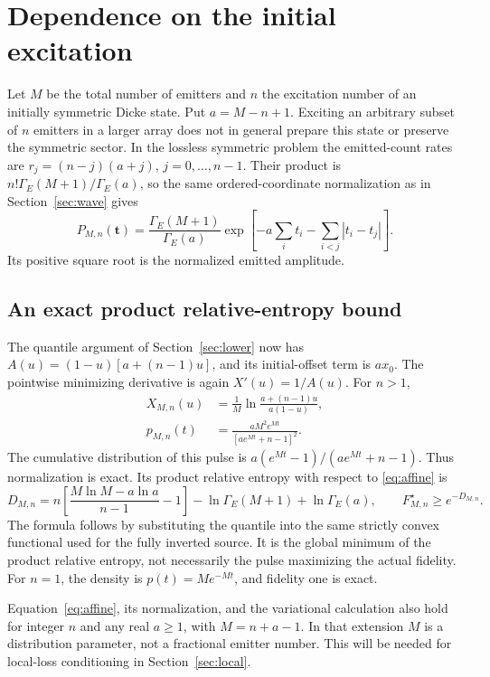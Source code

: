 \documentclass[11pt,a4paper]{article}
\newcommand{\GE}{\Gamma_{\!E}}
\begin{document}
\section{Dependence on the initial excitation}
\label{sec:partial}

Let \(M\) be the total number of emitters and \(n\) the excitation
number of an initially symmetric Dicke state. Put \(a=M-n+1\).
Exciting an arbitrary subset of \(n\) emitters in a larger array
does not in general prepare this state or preserve the symmetric
sector. In the lossless symmetric problem the emitted-count rates
are \(r_j=(n-j)(a+j)\), \(j=0,\ldots,n-1\). Their product is
\(n!\GE(M+1)/\GE(a)\), so the same ordered-coordinate normalization
as in Section~\ref{sec:wave} gives
\begin{equation}
 P_{M,n}(\boldsymbol t)=\frac{\GE(M+1)}{\GE(a)}
 \exp\!\left[-a\sum_i t_i-\sum_{i<j}|t_i-t_j|\right].
 \label{eq:affine}
\end{equation}
Its positive square root is the normalized emitted amplitude.

\subsection{An exact product relative-entropy bound}

The quantile argument of Section~\ref{sec:lower} now has
\(A(u)=(1-u)[a+(n-1)u]\), and its initial-offset term is \(a x_0\).
The pointwise minimizing derivative is again \(X'(u)=1/A(u)\).
For \(n>1\),
\begin{align}
 X_{M,n}(u)&=\frac1M
 \ln\frac{a+(n-1)u}{a(1-u)},\\
 p_{M,n}(t)&=\frac{aM^2e^{Mt}}{[ae^{Mt}+n-1]^2}.
 \label{eq:trial}
\end{align}
The cumulative distribution of this pulse is
\(a(e^{Mt}-1)/(ae^{Mt}+n-1)\). Thus normalization is exact.
Its product relative entropy with respect to \eqref{eq:affine} is
\begin{equation}
 \boxed{
 D_{M,n}=n\left[\frac{M\ln M-a\ln a}{n-1}-1\right]
 -\ln\GE(M+1)+\ln\GE(a),\qquad
 F_{M,n}^\star\ge e^{-D_{M,n}}.}
 \label{eq:D}
\end{equation}
The formula follows by substituting the quantile into the same
strictly convex functional used for the fully inverted source.
It is the global minimum of the product relative entropy, not
necessarily the pulse maximizing the actual fidelity. For \(n=1\),
the density is \(p(t)=M e^{-Mt}\), and fidelity one is exact.

Equation~\eqref{eq:affine}, its normalization, and the variational
calculation also hold for integer \(n\) and any real \(a\ge1\),
with \(M=n+a-1\). In that extension \(M\) is a distribution parameter,
not a fractional emitter number. This will be needed for local-loss
conditioning in Section~\ref{sec:local}.
\end{document}
